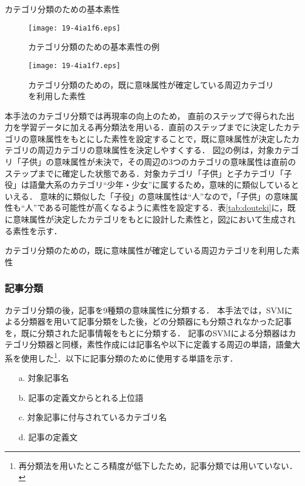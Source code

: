 \documentclass[japanese]{jnlp_1.4}
\begin{document}
\begin{table}[p]
\caption{カテゴリ分類のための基本素性}
\label{tab:seiteki}

\end{table}
\begin{figure}[p]
\begin{center}
\texttt{[image: 19-4ia1f6.eps]}
\end{center}
\caption{カテゴリ分類のための基本素性の例}
\label{fig:kizi_seiteki_sosei_rei}
\end{figure}

\begin{figure}[t]
\begin{center}
\texttt{[image: 19-4ia1f7.eps]}
\end{center}
\caption{カテゴリ分類のための，既に意味属性が確定している周辺カテゴリを利用した素性}
\label{fig:kizi_douteki_sosei_rei}
\vspace{-0.5\baselineskip}
\end{figure}

本手法のカテゴリ分類では再現率の向上のため，
直前のステップで得られた出力を学習データに加える再分類法を用いる．直前のステップまでに決定したカテゴリの意味属性をもとにした素性を設定することで，既に意味属性が決定したカテゴリの周辺カテゴリの意味属性を決定しやすくする．
図\ref{fig:kizi_douteki_sosei_rei}の例は，対象カテゴリ「子供」の意味属性が未決で，その周辺の3つのカテゴリの意味属性は直前のステップまでに確定した状態である．対象カテゴリ「子供」と子カテゴリ「子役」は語彙大系のカテゴリ``少年・少女''に属するため，意味的に類似しているといえる．
意味的に類似した「子役」の意味属性は``人''なので，「子供」の意味属性も``人''である可能性が高くなるように素性を設定する．表\ref{tab:douteki}に，既に意味属性が決定したカテゴリをもとに設計した素性と，図\ref{fig:kizi_douteki_sosei_rei}において生成される素性を示す．

\begin{table}[t]
\caption{カテゴリ分類のための，既に意味属性が確定している周辺カテゴリを利用した素性}
\label{tab:douteki}

\end{table}



\subsubsection{記事分類}
\label{sec:kizi_bunrui_mondai}

カテゴリ分類の後，記事を9種類の意味属性に分類する．
本手法では，SVMによる分類器を用いて記事分類をした後，どの分類器にも分類されなかった記事を，既に分類された記事情報をもとに分類する．
記事のSVMによる分類器はカテゴリ分類器と同様，素性作成には記事名や以下に定義する周辺の単語，語彙大系を使用した\footnote{再分類法を用いたところ精度が低下したため，記事分類では用いていない．}．以下に記事分類のために使用する単語を示す．
\begin{itemize}
\item[a.]
対象記事名
\item[b.]
記事の定義文からとれる上位語
\item[c.]
対象記事に付与されているカテゴリ名
\item[d.]
記事の定義文
\end{itemize}
\end{document}
